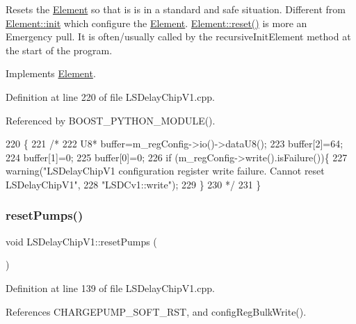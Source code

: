 Resets the \hyperlink{classElement}{Element} so that is is in a standard and safe situation. Different from \hyperlink{classElement_af42754b5cabc198869222725218d695c}{Element\+::init} which configure the \hyperlink{classElement}{Element}. \hyperlink{classElement_a69efffa22f06909d768149715565cb56}{Element\+::reset()} is more an Emergency pull. It is often/usually called by the recursive\+Init\+Element method at the start of the program. 

Implements \hyperlink{classElement_a69efffa22f06909d768149715565cb56}{Element}.



Definition at line 220 of file L\+S\+Delay\+Chip\+V1.\+cpp.



Referenced by B\+O\+O\+S\+T\+\_\+\+P\+Y\+T\+H\+O\+N\+\_\+\+M\+O\+D\+U\+L\+E().


\begin{DoxyCode}
220                          \{
221 \textcolor{comment}{/*}
222 \textcolor{comment}{  U8* buffer=m\_regConfig->io()->dataU8();
}
223 \textcolor{comment}{  buffer[2]=64;
}
224 \textcolor{comment}{  buffer[1]=0;
}
225 \textcolor{comment}{  buffer[0]=0;
}
226 \textcolor{comment}{  if (m\_regConfig->write().isFailure())\{
}
227 \textcolor{comment}{    warning("LSDelayChipV1 configuration register write failure. Cannot reset LSDelayChipV1",
}
228 \textcolor{comment}{        "LSDCv1::write");
}
229 \textcolor{comment}{  \}
}
230 \textcolor{comment}{  */}
231 \}
\end{DoxyCode}
\mbox{\label{classLSDelayChipV1_a5b2c2e527b044b128306695828e9fd19}} 
\subsubsection{\texorpdfstring{reset\+Pumps()}{resetPumps()}}
{\footnotesize\ttfamily void L\+S\+Delay\+Chip\+V1\+::reset\+Pumps (\begin{DoxyParamCaption}{ }\end{DoxyParamCaption})}



Definition at line 139 of file L\+S\+Delay\+Chip\+V1.\+cpp.



References C\+H\+A\+R\+G\+E\+P\+U\+M\+P\+\_\+\+S\+O\+F\+T\+\_\+\+R\+ST, and config\+Reg\+Bulk\+Write().


